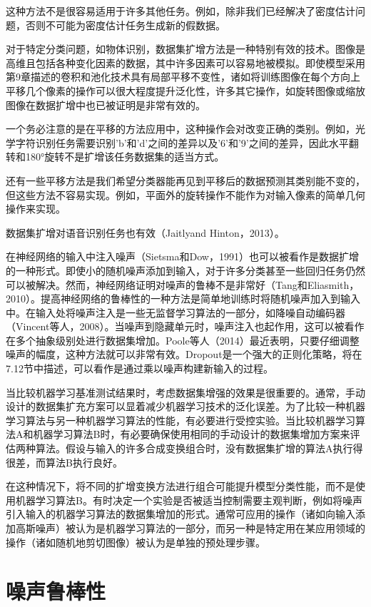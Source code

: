 这种方法不是很容易适用于许多其他任务。例如，除非我们已经解决了密度估计问题，否则不可能为密度估计任务生成新的假数据。

对于特定分类问题，如物体识别，数据集扩增方法是一种特别有效的技术。图像是高维且包括各种变化因素的数据，其中许多因素可以容易地被模拟。即使模型采用第9章描述的卷积和池化技术具有局部平移不变性，诸如将训练图像在每个方向上平移几个像素的操作可以很大程度提升泛化性，许多其它操作，如旋转图像或缩放图像在数据扩增中也已被证明是非常有效的。

一个务必注意的是在平移的方法应用中，这种操作会对改变正确的类别。例如，光学字符识别任务需要识别'b'和'd'之间的差异以及'6'和'9'之间的差异，因此水平翻转和180°旋转不是扩增该任务数据集的适当方式。

还有一些平移方法是我们希望分类器能再见到平移后的数据预测其类别能不变的，但这些方法不容易实现。例如，平面外的旋转操作不能作为对输入像素的简单几何操作来实现。

数据集扩增对语音识别任务也有效（Jaitlyand Hinton，2013）。

在神经网络的输入中注入噪声（Sietsma和Dow，1991）也可以被看作是数据扩增的一种形式。即使小的随机噪声添加到输入，对于许多分类甚至一些回归任务仍然可以被解决。然而，神经网络证明对噪声的鲁棒不是非常好（Tang和Eliasmith，2010）。提高神经网络的鲁棒性的一种方法是简单地训练时将随机噪声加入到输入中。在输入处将噪声注入是一些无监督学习算法的一部分，如降噪自动编码器（Vincent等人，2008）。当噪声到隐藏单元时，噪声注入也起作用，这可以被看作在多个抽象级别处进行数据集增加。Poole等人（2014）最近表明，只要仔细调整噪声的幅度，这种方法就可以非常有效。Dropout是一个强大的正则化策略，将在7.12节中描述，可以看作是通过乘以噪声构建新输入的过程。

当比较机器学习基准测试结果时，考虑数据集增强的效果是很重要的。通常，手动设计的数据集扩充方案可以显着减少机器学习技术的泛化误差。为了比较一种机器学习算法与另一种机器学习算法的性能，有必要进行受控实验。当比较机器学习算法A和机器学习算法B时，有必要确保使用相同的手动设计的数据集增加方案来评估两种算法。假设与输入的许多合成变换组合时，没有数据集扩增的算法A执行得很差，而算法B执行良好。

在这种情况下，将不同的扩增变换方法进行组合可能提升模型分类性能，而不是使用机器学习算法B。有时决定一个实验是否被适当控制需要主观判断，例如将噪声引入输入的机器学习算法的数据集增加的形式。通常可应用的操作（诸如向输入添加高斯噪声）被认为是机器学习算法的一部分，而另一种是特定用在某应用领域的操作（诸如随机地剪切图像）被认为是单独的预处理步骤。

\section{噪声鲁棒性}

